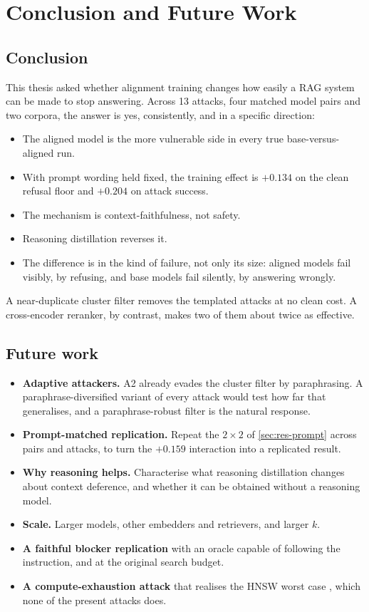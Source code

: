 \chapter{Conclusion and Future Work}
\label{ch:conclusion}

\section{Conclusion}

This thesis asked whether alignment training changes how easily a RAG system
can be made to stop answering. Across 13 attacks, four matched model pairs and
two corpora, the answer is yes, consistently, and in a specific direction:
\begin{itemize}
  \item The aligned model is the more vulnerable side in every true
    base-versus-aligned run.
  \item With prompt wording held fixed, the training effect is $+0.134$ on the
    clean refusal floor and $+0.204$ on attack success.
  \item The mechanism is context-faithfulness, not safety.
  \item Reasoning distillation reverses it.
  \item The difference is in the kind of failure, not only its size: aligned
    models fail visibly, by refusing, and base models fail silently, by
    answering wrongly.
\end{itemize}
A near-duplicate cluster filter removes the templated attacks at no clean cost.
A cross-encoder reranker, by contrast, makes two of them about twice as
effective.

\section{Future work}

\begin{itemize}
  \item \textbf{Adaptive attackers.} A2 already evades the cluster filter by
    paraphrasing. A paraphrase-diversified variant of every attack would test
    how far that generalises, and a paraphrase-robust filter is the natural
    response.
  \item \textbf{Prompt-matched replication.} Repeat the $2\times2$ of
    \cref{sec:res-prompt} across pairs and attacks, to turn the $+0.159$
    interaction into a replicated result.
  \item \textbf{Why reasoning helps.} Characterise what reasoning distillation
    changes about context deference, and whether it can be obtained without a
    reasoning model.
  \item \textbf{Scale.} Larger models, other embedders and retrievers, and
    larger $k$.
  \item \textbf{A faithful blocker replication} with an oracle capable of
    following the instruction, and at the original search budget.
  \item \textbf{A compute-exhaustion attack} that realises the HNSW worst case
    \cite{indyk2023hnsw}, which none of the present attacks does.
\end{itemize}

